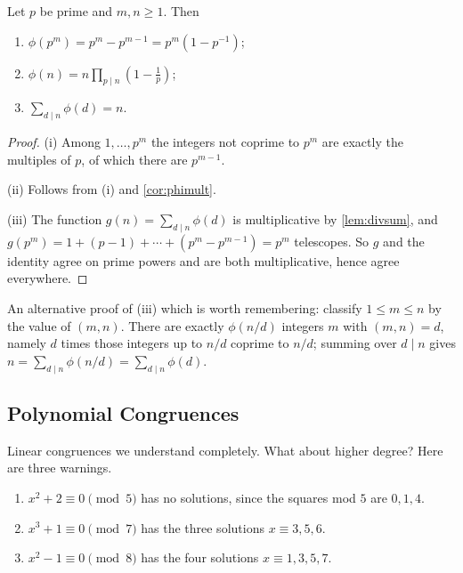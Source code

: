 \begin{theorem}\label{thm:phiformula}
	Let $p$ be prime and $m, n \geq 1$. Then
	\begin{enumerate}[label=(\roman*)]
		\item $\phi(p^m) = p^m - p^{m-1} = p^m(1 - p^{-1})$;
		\item $\phi(n) = n \prod_{p \mid n} \left(1 - \frac 1p\right)$;
		\item $\sum_{d \mid n} \phi(d) = n$.
	\end{enumerate}
\end{theorem}
\begin{proof}
	(i) Among $1, \dots, p^m$ the integers not coprime to $p^m$ are exactly the multiples of $p$, of which there are $p^{m-1}$.

	(ii) Follows from (i) and \autoref{cor:phimult}.

	(iii) The function $g(n) = \sum_{d \mid n} \phi(d)$ is multiplicative by \autoref{lem:divsum}, and $g(p^m) = 1 + (p - 1) + \cdots + (p^m - p^{m-1}) = p^m$ telescopes. So $g$ and the identity agree on prime powers and are both multiplicative, hence agree everywhere.
\end{proof}

An alternative proof of (iii) which is worth remembering: classify $1 \leq m \leq n$ by the value of $(m, n)$. There are exactly $\phi(n/d)$ integers $m$ with $(m,n) = d$, namely $d$ times those integers up to $n/d$ coprime to $n/d$; summing over $d \mid n$ gives $n = \sum_{d \mid n} \phi(n/d) = \sum_{d \mid n} \phi(d)$.

\subsection{Polynomial Congruences}

Linear congruences we understand completely. What about higher degree? Here are three warnings.

\begin{example}
	\begin{enumerate}[label=(\roman*)]
		\item $x^2 + 2 \equiv 0 \pmod 5$ has no solutions, since the squares mod $5$ are $0, 1, 4$.
		\item $x^3 + 1 \equiv 0 \pmod 7$ has the three solutions $x \equiv 3, 5, 6$.
		\item $x^2 - 1 \equiv 0 \pmod 8$ has the four solutions $x \equiv 1, 3, 5, 7$.
	\end{enumerate}
\end{example}

